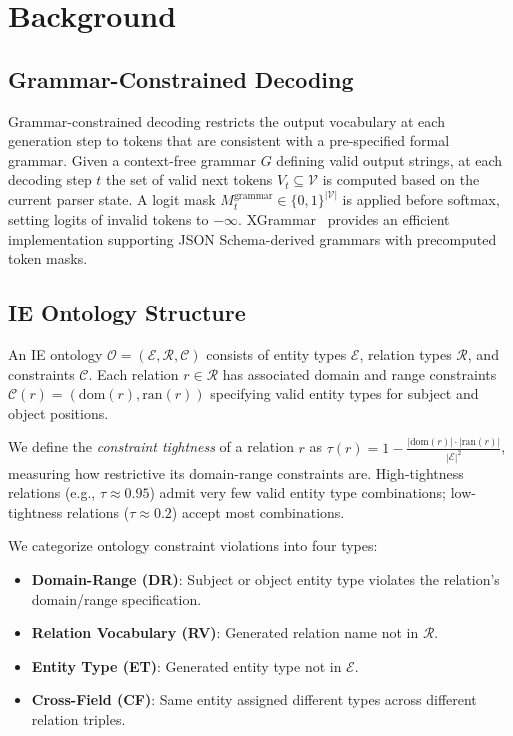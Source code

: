 \documentclass[11pt,a4paper]{article}
\newcommand{\tight}{\tau}
\begin{document}
\section{Background}

\subsection{Grammar-Constrained Decoding}

Grammar-constrained decoding restricts the output vocabulary at each generation step to tokens that are consistent with a pre-specified formal grammar. Given a context-free grammar $G$ defining valid output strings, at each decoding step $t$ the set of valid next tokens $V_t \subseteq \mathcal{V}$ is computed based on the current parser state. A logit mask $M_t^{\text{grammar}} \in \{0,1\}^{|\mathcal{V}|}$ is applied before softmax, setting logits of invalid tokens to $-\infty$. XGrammar~\cite{dong2024xgrammar} provides an efficient implementation supporting JSON Schema-derived grammars with precomputed token masks.

\subsection{IE Ontology Structure}

An IE ontology $\mathcal{O} = (\mathcal{E}, \mathcal{R}, \mathcal{C})$ consists of entity types $\mathcal{E}$, relation types $\mathcal{R}$, and constraints $\mathcal{C}$. Each relation $r \in \mathcal{R}$ has associated domain and range constraints $\mathcal{C}(r) = (\text{dom}(r), \text{ran}(r))$ specifying valid entity types for subject and object positions.

We define the \emph{constraint tightness} of a relation $r$ as $\tight(r) = 1 - \frac{|\text{dom}(r)| \cdot |\text{ran}(r)|}{|\mathcal{E}|^2}$, measuring how restrictive its domain-range constraints are. High-tightness relations (e.g., $\tight \approx 0.95$) admit very few valid entity type combinations; low-tightness relations ($\tight \approx 0.2$) accept most combinations.

We categorize ontology constraint violations into four types:
\begin{itemize}
    \item \textbf{Domain-Range (DR)}: Subject or object entity type violates the relation's domain/range specification.
    \item \textbf{Relation Vocabulary (RV)}: Generated relation name not in $\mathcal{R}$.
    \item \textbf{Entity Type (ET)}: Generated entity type not in $\mathcal{E}$.
    \item \textbf{Cross-Field (CF)}: Same entity assigned different types across different relation triples.
\end{itemize}
\end{document}
